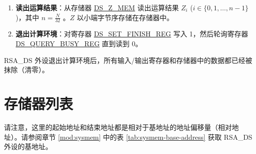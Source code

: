 \documentclass[main\_\_CN.tex]{subfiles}
\begin{document}
\begin{enumerate}
\begin{itemize}
        \item 如果返回值为 3，则说明填充校验失败，且 MD 校验失败。 这种情况说明有致命错误发生。\begin{math}Z\end{math} 结果值无效。跳至步骤 \ref{other:digsig-step-exit}。
        
    \end{itemize}
        
    \item {\bfseries 读出运算结果}：从存储器 \hyperref[DSZMEM]{DS\_Z\_MEM} 读出运算结果 \begin{math}Z_{i}\end{math} (\begin{math}i \in \{0,1, \dots,n-1\}\end{math})，其中 \begin{math} n = \frac{N}{32} \end{math} 。\begin{math}Z\end{math} 以小端字节序存储在存储器中。
    
    \item {\bfseries 退出计算环境\label{other:digsig-step-exit}}：对寄存器 \hyperref[regdesc:DSSETFINISHREG]{DS\_SET\_FINISH\_REG} 写入 1，然后轮询寄存器 \hyperref[regdesc:DSQUERYBUSYREG]{DS\_QUERY\_BUSY\_REG} 直到读到 0。

\end{enumerate}

RSA\_DS 外设退出计算环境后，所有输入/输出寄存器和存储器中的数据都已经被抹除（清零）。



\clearpage
\section{ 存储器列表 }
\label{sec:digsig-mem-summ}

请注意，这里的起始地址和结束地址都是相对于基地址的地址偏移量（相对地址）。请参阅章节 \ref{mod:sysmem} \textit{} 中的表 \ref{tab:sysmem-base-address} 获取 RSA\_DS 外设的基地址。





\end{document}

